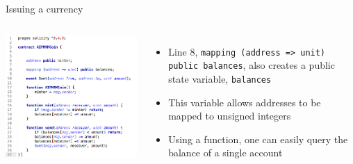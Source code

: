 \documentclass[9pt]{beamer}
\begin{document}
\begin{frame}{Issuing a currency}
	\begin{columns}
	    \includegraphics  [scale=0.3]{Images/contract5}

	    \begin{itemize}
		    \item Line 8, \texttt{mapping (address => unit) public balances}, also creates a public state variable, \texttt{balances}
			\item This variable allows addresses to be mapped to unsigned integers
			\item Using a function, one can easily query the balance of a single account
	    \end{itemize}
	\end{columns}
\end{frame}

\end{document}
